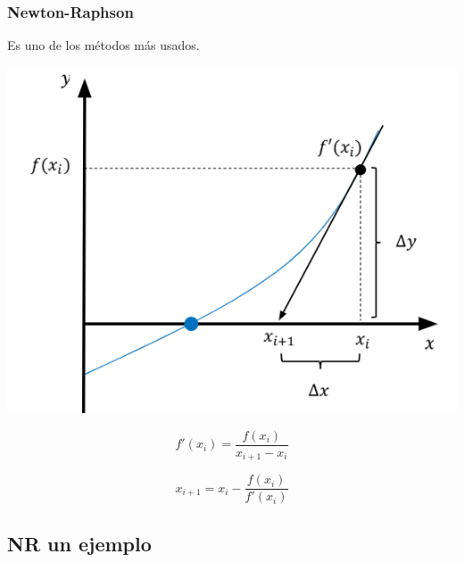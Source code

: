 \documentclass[xcolor=svgnames]{beamer} %
\theoremstyle{plain}
\theoremstyle{definition}
\begin{document}
\begin{frame}
\frametitle{Newton-Raphson}
Es uno de los métodos más usados.

\begin{minipage}{.7\linewidth}
\includegraphics[width=\linewidth]{NewthonRaphson/NR.PNG} 
\end{minipage} \pause \begin{minipage}{.2\linewidth}

$$f'(x_i) = \frac{f(x_i)}{x_{i+1}-x_i}  $$

\begin{equation}
\label{eq:nr}
x_{i+1} = x_i - \frac{f(x_i)}{f'(x_i)} 
\end{equation}
\end{minipage}

\end{frame}

\subsection{NR un ejemplo}
\end{document}

